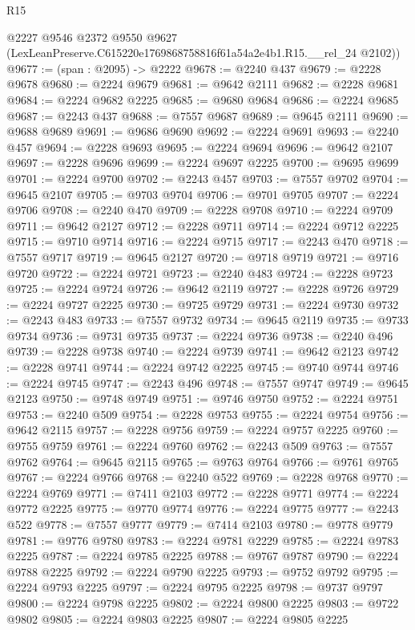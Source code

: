 \begin{lexlean}{R15}
\begin{coremodule}
      @2227
      @9546
      @2372
      @9550
      @9627
      (LexLeanPreserve.C615220e1769868758816f61a54a2e4b1.R15.__rel_24 @2102))
@9677 := (span : @2095) -> @2222
@9678 := @2240 @437
@9679 := @2228 @9678
@9680 := @2224 @9679
@9681 := @9642 @2111
@9682 := @2228 @9681
@9684 := @2224 @9682 @2225
@9685 := @9680 @9684
@9686 := @2224 @9685
@9687 := @2243 @437
@9688 := @7557 @9687
@9689 := @9645 @2111
@9690 := @9688 @9689
@9691 := @9686 @9690
@9692 := @2224 @9691
@9693 := @2240 @457
@9694 := @2228 @9693
@9695 := @2224 @9694
@9696 := @9642 @2107
@9697 := @2228 @9696
@9699 := @2224 @9697 @2225
@9700 := @9695 @9699
@9701 := @2224 @9700
@9702 := @2243 @457
@9703 := @7557 @9702
@9704 := @9645 @2107
@9705 := @9703 @9704
@9706 := @9701 @9705
@9707 := @2224 @9706
@9708 := @2240 @470
@9709 := @2228 @9708
@9710 := @2224 @9709
@9711 := @9642 @2127
@9712 := @2228 @9711
@9714 := @2224 @9712 @2225
@9715 := @9710 @9714
@9716 := @2224 @9715
@9717 := @2243 @470
@9718 := @7557 @9717
@9719 := @9645 @2127
@9720 := @9718 @9719
@9721 := @9716 @9720
@9722 := @2224 @9721
@9723 := @2240 @483
@9724 := @2228 @9723
@9725 := @2224 @9724
@9726 := @9642 @2119
@9727 := @2228 @9726
@9729 := @2224 @9727 @2225
@9730 := @9725 @9729
@9731 := @2224 @9730
@9732 := @2243 @483
@9733 := @7557 @9732
@9734 := @9645 @2119
@9735 := @9733 @9734
@9736 := @9731 @9735
@9737 := @2224 @9736
@9738 := @2240 @496
@9739 := @2228 @9738
@9740 := @2224 @9739
@9741 := @9642 @2123
@9742 := @2228 @9741
@9744 := @2224 @9742 @2225
@9745 := @9740 @9744
@9746 := @2224 @9745
@9747 := @2243 @496
@9748 := @7557 @9747
@9749 := @9645 @2123
@9750 := @9748 @9749
@9751 := @9746 @9750
@9752 := @2224 @9751
@9753 := @2240 @509
@9754 := @2228 @9753
@9755 := @2224 @9754
@9756 := @9642 @2115
@9757 := @2228 @9756
@9759 := @2224 @9757 @2225
@9760 := @9755 @9759
@9761 := @2224 @9760
@9762 := @2243 @509
@9763 := @7557 @9762
@9764 := @9645 @2115
@9765 := @9763 @9764
@9766 := @9761 @9765
@9767 := @2224 @9766
@9768 := @2240 @522
@9769 := @2228 @9768
@9770 := @2224 @9769
@9771 := @7411 @2103
@9772 := @2228 @9771
@9774 := @2224 @9772 @2225
@9775 := @9770 @9774
@9776 := @2224 @9775
@9777 := @2243 @522
@9778 := @7557 @9777
@9779 := @7414 @2103
@9780 := @9778 @9779
@9781 := @9776 @9780
@9783 := @2224 @9781 @2229
@9785 := @2224 @9783 @2225
@9787 := @2224 @9785 @2225
@9788 := @9767 @9787
@9790 := @2224 @9788 @2225
@9792 := @2224 @9790 @2225
@9793 := @9752 @9792
@9795 := @2224 @9793 @2225
@9797 := @2224 @9795 @2225
@9798 := @9737 @9797
@9800 := @2224 @9798 @2225
@9802 := @2224 @9800 @2225
@9803 := @9722 @9802
@9805 := @2224 @9803 @2225
@9807 := @2224 @9805 @2225

\end{coremodule}
\end{lexlean}
